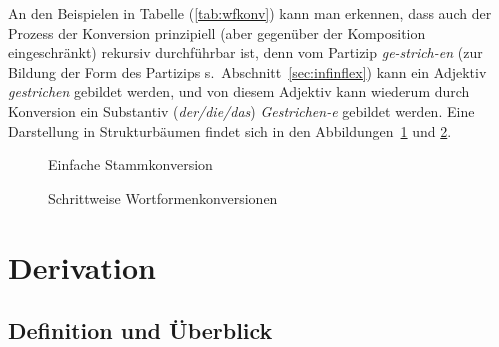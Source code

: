 An den Beispielen in Tabelle (\ref{tab:wfkonv}) kann man erkennen, dass auch der Prozess der Konversion prinzipiell (aber gegenüber der Komposition eingeschränkt) rekursiv durchführbar ist, denn vom Partizip \textit{ge-strich-en} (zur Bildung der Form des Partizips s.\ Abschnitt~\ref{sec:infinflex}) kann ein Adjektiv \textit{gestrichen} gebildet werden, und von diesem Adjektiv kann wiederum durch Konversion ein Substantiv (\textit{der\slash die\slash das}) \textit{Gestrichen-e} gebildet werden.
Eine Darstellung in Strukturbäumen findet sich in den Abbildungen~\ref{fig:konv1} und \ref{fig:konv2}.

\begin{figure}
  \centering
  \caption{Einfache Stammkonversion}
  \label{fig:konv1}
\end{figure}

\begin{figure}
  \centering
  \caption{Schrittweise Wortformenkonversionen}
  \label{fig:konv2}
\end{figure}

\section{Derivation}

\label{sec:deriv}

\subsection{Definition und Überblick}

